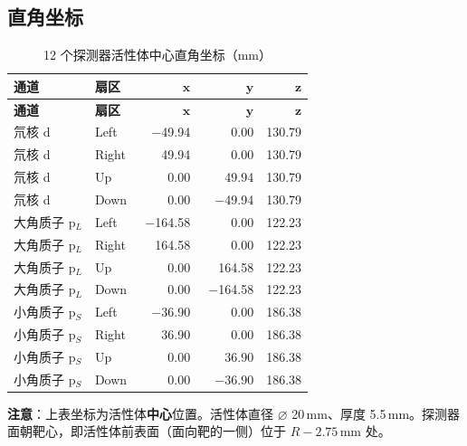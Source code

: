 \documentclass[UTF8,10pt,letterpaper,fontset=none]{ctexart}
\begin{document}
\subsection{直角坐标}

\begin{longtable}{ll rrr}
\caption{12 个探测器活性体中心直角坐标（mm）} \label{tab:cartesian} \\
\toprule
\sffamily\small\textbf{通道} & \sffamily\small\textbf{扇区} & \sffamily\small$\boldsymbol{x}$ & \sffamily\small$\boldsymbol{y}$ & \sffamily\small$\boldsymbol{z}$ \\
\midrule
\endfirsthead
\toprule
\sffamily\small\textbf{通道} & \sffamily\small\textbf{扇区} & \sffamily\small$\boldsymbol{x}$ & \sffamily\small$\boldsymbol{y}$ & \sffamily\small$\boldsymbol{z}$ \\
\midrule
\endhead
\rowcolor{DetD!8}
氘核 d      & Left   & $-$49.94 & $\phantom{-}$0.00 & 130.79 \\
\rowcolor{DetD!8}
氘核 d      & Right  & $\phantom{-}$49.94 & $\phantom{-}$0.00 & 130.79 \\
\rowcolor{DetD!8}
氘核 d      & Up     & $\phantom{-}$0.00 & $\phantom{-}$49.94 & 130.79 \\
\rowcolor{DetD!8}
氘核 d      & Down   & $\phantom{-}$0.00 & $-$49.94 & 130.79 \\
\midrule
\rowcolor{DetPL!8}
大角质子 p$_L$ & Left   & $-$164.58 & $\phantom{-}$0.00 & 122.23 \\
\rowcolor{DetPL!8}
大角质子 p$_L$ & Right  & $\phantom{-}$164.58 & $\phantom{-}$0.00 & 122.23 \\
\rowcolor{DetPL!8}
大角质子 p$_L$ & Up     & $\phantom{-}$0.00 & $\phantom{-}$164.58 & 122.23 \\
\rowcolor{DetPL!8}
大角质子 p$_L$ & Down   & $\phantom{-}$0.00 & $-$164.58 & 122.23 \\
\midrule
\rowcolor{DetPS!8}
小角质子 p$_S$ & Left   & $-$36.90 & $\phantom{-}$0.00 & 186.38 \\
\rowcolor{DetPS!8}
小角质子 p$_S$ & Right  & $\phantom{-}$36.90 & $\phantom{-}$0.00 & 186.38 \\
\rowcolor{DetPS!8}
小角质子 p$_S$ & Up     & $\phantom{-}$0.00 & $\phantom{-}$36.90 & 186.38 \\
\rowcolor{DetPS!8}
小角质子 p$_S$ & Down   & $\phantom{-}$0.00 & $-$36.90 & 186.38 \\
\bottomrule
\end{longtable}

\begin{tcolorbox}[colback=SheetAmber,colframe=SheetBlue!40,boxsep=3pt,left=8pt,right=8pt,top=3pt,bottom=3pt]
\sffamily\small
\textbf{注意}：上表坐标为活性体\textbf{中心}位置。活性体直径 \ensuremath{\varnothing} 20\,mm、厚度 5.5\,mm。探测器面朝靶心，即活性体前表面（面向靶的一侧）位于 $R - 2.75$\,mm 处。
\end{tcolorbox}
\end{document}
